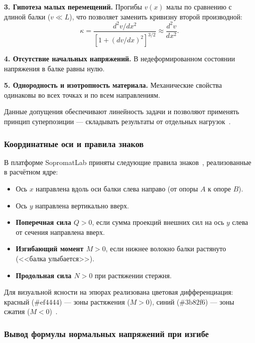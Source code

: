 \textbf{3. Гипотеза малых перемещений.} Прогибы $v(x)$ малы по сравнению с длиной балки ($v \ll L$), что позволяет заменить кривизну второй производной:
\begin{equation}
  \kappa = \frac{d^2 v / dx^2}{\left[1 + (dv/dx)^2\right]^{3/2}} \approx \frac{d^2 v}{dx^2}.
  \label{eq:small_disp}
\end{equation}

\textbf{4. Отсутствие начальных напряжений.} В недеформированном состоянии напряжения в балке равны нулю.

\textbf{5. Однородность и изотропность материала.} Механические свойства одинаковы во всех точках и по всем направлениям.

Данные допущения обеспечивают линейность задачи и позволяют применять принцип суперпозиции --- складывать результаты от отдельных нагрузок~\cite{aleksandrov, beer2020}.

\subsubsection{Координатные оси и правила знаков}

В платформе SopromatLab приняты следующие правила знаков~\cite{feodosev, belyaev}, реализованные в расчётном ядре:

\begin{itemize}
  \item Ось $x$ направлена вдоль оси балки слева направо (от опоры $A$ к опоре $B$).
  \item Ось $y$ направлена вертикально вверх.
  \item \textbf{Поперечная сила $Q > 0$}, если сумма проекций внешних сил на ось $y$ слева от сечения направлена вверх.
  \item \textbf{Изгибающий момент $M > 0$}, если нижнее волокно балки растянуто (<<балка улыбается>>).
  \item \textbf{Продольная сила $N > 0$} при растяжении стержня.
\end{itemize}

Для визуальной ясности на эпюрах реализована цветовая дифференциация: красный ($\text{\#ef4444}$) --- зоны растяжения ($M > 0$), синий ($\text{\#3b82f6}$) --- зоны сжатия ($M < 0$)~\cite{bostock2011}.

\subsubsection{Вывод формулы нормальных напряжений при изгибе}

